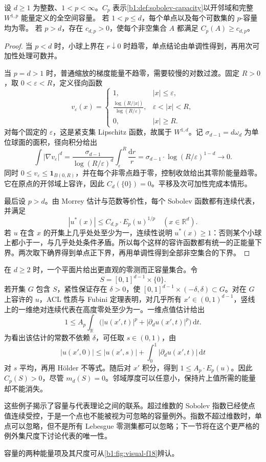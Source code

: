 \begin{proposition}\label{b1:prop:sobolev-point-capacity}
设 \(d\geq1\) 为整数、\(1<p<\infty\)。\(C_p\) 表示\cref{b1:def:sobolev-capacity}以开邻域和完整 \(W^{1,p}\) 能量定义的全空间容量。
若 \(1<p\le d\)，每个单点以及每个可数集的 \(p\)-容量均为零。
若 \(p>d\)，存在 \(c_{d,p}>0\)，使每个非空集合 \(A\) 都满足 \(C_p(A)\ge c_{d,p}\)。
\end{proposition}
\begin{proof}
当 \(p<d\) 时，小球上界在 \(r\downarrow0\) 时趋零，单点结论由单调性得到，再用次可加性处理可数并。

当 \(p=d>1\) 时，普通缩放的梯度能量不趋零，需要较慢的对数过渡。固定 \(R>0\)，取 \(0<\varepsilon<R\)，定义径向函数
\[
 v_\varepsilon(x)=
 \begin{cases}
 1,&|x|\le\varepsilon,\\
 \displaystyle\frac{\log(R/|x|)}{\log(R/\varepsilon)},
       &\varepsilon<|x|<R,\\
 0,&|x|\ge R.
 \end{cases}
\]
对每个固定的 \(\varepsilon\)，这是紧支集 Lipschitz 函数，故属于 \(W^{1,d}\)。记 \(\sigma_{d-1}=d\omega_d\) 为单位球面的面积，径向积分给出
\[
 \int|\nabla v_\varepsilon|^d
 =\frac{\sigma_{d-1}}{\log(R/\varepsilon)^d}
            \int_\varepsilon^R\frac{\mathrm dr}{r}
 =\sigma_{d-1}\cdot \log(R/\varepsilon)^{1-d}\longrightarrow0.
\]
同时 \(0\le v_\varepsilon\le\mathbf1_{B(0,R)}\)，并在每个非零点趋于零，控制收敛给出其零阶能量趋零。它在原点的开邻域上容许，因此 \(C_d(\{0\})=0\)。平移及次可加性完成本情形。

最后设 \(p>d\)。由 Morrey 估计与范数等价性，每个 Sobolev 函数都有连续代表，并满足
\[
 |u^*(x)|\le C_{d,p}\cdot E_p(u)^{1/p}
 \quad(x\in\mathbb R^d).
\]
若 \(u\) 在含 \(x\) 的开集上几乎处处至少为一，连续性说明 \(u^*(x)\ge1\)：否则某个小球上都小于一，与几乎处处条件矛盾。所以每个这样的容许函数都有统一的正能量下界。两次取下确界得到单点正下界，再用单调性得到全部非空集合的下界。
\end{proof}

在 \(d\ge2\) 时，一个平面片给出更直观的零测而正容量集合。令
\[
 S=[0,1]^{d-1}\times\{0\}.
\]
若开集 \(G\) 包含 \(S\)，紧性保证存在 \(\delta>0\)，使 \([0,1]^{d-1}\times(-\delta,\delta)\subset G\)。对在 \(G\) 上容许的 \(u\)，ACL 性质与 Fubini 定理表明，对几乎所有 \(x'\in(0,1)^{d-1}\)，竖线上的一维绝对连续代表在高度零处至少为一。一维点值估计给出
\[
 1\le A_p\int_{\mathbb R}
          \bigl(|u(x',t)|^p+|\partial_du(x',t)|^p\bigr)\,\mathrm dt.
\]
为看出该估计的常数不依赖 \(\delta\)，可任取 \(s\in(0,1)\)，由
\[
 |u(x',0)|\le |u(x',s)|+\int_0^1|\partial_du(x',t)|\,\mathrm dt
\]
对 \(s\) 平均，再用 Hölder 不等式。随后对 \(x'\) 积分，得到 \(1\le A_p\cdot E_p(u)\)。因此 \(C_p(S)>0\)，尽管 \(m_d(S)=0\)。邻域厚度可以任意小，保持片上值所需的能量却不能消失。

\ProseParagraphBreak

这些例子揭示了容量与代表理论之间的联系。超过维数的 Sobolev 指数已经使点值连续受控，于是一个点也不能被视为可忽略的容量例外。指数不超过维数时，单点可以忽略，但不是所有 Lebesgue 零测集都可以忽略；下一节将在这个更严格的例外集尺度下讨论代表的唯一性。

容量的两种能量项及其尺度可从\cref{b1:fig:visual-f18}辨认。

